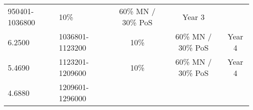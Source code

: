 \documentclass[11pt,a4paperpaper,]{report}
\begin{document}
\begin{longtable}[]{@{}llccc@{}}
\begin{minipage}[t]{0.19\columnwidth}
950401-1036800\strut
\end{minipage} & \begin{minipage}[t]{0.14\columnwidth}\centering\strut
10\%\strut
\end{minipage} & \begin{minipage}[t]{0.24\columnwidth}\centering\strut
60\% MN / 30\% PoS\strut
\end{minipage} & \begin{minipage}[t]{0.12\columnwidth}\centering\strut
Year 3\strut
\end{minipage}\tabularnewline
\begin{minipage}[t]{0.12\columnwidth}\raggedright\strut
6.2500\strut
\end{minipage} & \begin{minipage}[t]{0.19\columnwidth}\raggedright\strut
1036801-1123200\strut
\end{minipage} & \begin{minipage}[t]{0.14\columnwidth}\centering\strut
10\%\strut
\end{minipage} & \begin{minipage}[t]{0.24\columnwidth}\centering\strut
60\% MN / 30\% PoS\strut
\end{minipage} & \begin{minipage}[t]{0.12\columnwidth}\centering\strut
Year 4\strut
\end{minipage}\tabularnewline
\begin{minipage}[t]{0.12\columnwidth}\raggedright\strut
5.4690\strut
\end{minipage} & \begin{minipage}[t]{0.19\columnwidth}\raggedright\strut
1123201-1209600\strut
\end{minipage} & \begin{minipage}[t]{0.14\columnwidth}\centering\strut
10\%\strut
\end{minipage} & \begin{minipage}[t]{0.24\columnwidth}\centering\strut
60\% MN / 30\% PoS\strut
\end{minipage} & \begin{minipage}[t]{0.12\columnwidth}\centering\strut
Year 4\strut
\end{minipage}\tabularnewline
\begin{minipage}[t]{0.12\columnwidth}\raggedright\strut
4.6880\strut
\end{minipage} & \begin{minipage}[t]{0.19\columnwidth}\raggedright\strut
1209601-1296000\strut
\end{minipage} & \begin{minipage}[t]{0.14\columnwidth}\centering\strut

\end{minipage}
\end{longtable}
\end{document}
